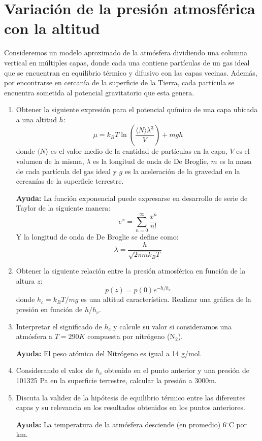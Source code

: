 \documentclass[a4paper,11pt]{article}
\begin{document}
\section{Variación de la presión atmosférica con la altitud}

Consideremos un modelo aproximado de la atmósfera dividiendo una 
columna vertical en múltiples capas, donde cada una contiene partículas 
de un gas ideal que se encuentran en equilibrio térmico y difusivo con 
las capas vecinas. Además, por encontrarse en cercanía de la superficie 
de la Tierra, cada partícula se encuentra sometida al potencial 
gravitatorio que esta genera.


\begin{enumerate}[label=(\alph*),
                  leftmargin=2\parindent,
                  rightmargin=2\parindent]

    \item{Obtener la siguiente expresión para el potencial químico de 
          una capa ubicada a una altitud $h$:
          $$ \mu =
          k_B T \ln \left( \frac{\langle N \rangle \lambda^3}{V} \right)
          + mgh $$
          donde $\langle N \rangle$ es el valor medio de la cantidad de 
          partículas en la capa, $V$ es el volumen de la misma, 
          $\lambda$ es la longitud de onda de De Broglie, $m$ es la 
          masa de cada partícula del gas ideal y $g$ es la aceleración 
          de la gravedad en la cercanías de la superficie terrestre.
          }

    {\small
    \textbf{Ayuda:}
    La función exponencial puede expresarse en desarrollo de serie de 
    Taylor de la siguiente manera:
    $$ e^x = \sum_{n=0}^\infty \frac{x^n}{n!} $$
    Y la longitud de onda de De Broglie se define como:
    $$ \lambda = \frac{h}{\sqrt{2\pi m k_B T}} $$
    }

    \item{Obtener la siguiente relación entre la presión atmosférica 
          en función de la altura $z$:
          $$ p(z) = p(0) e^{-h/h_c} $$
          donde $h_c = k_B T / mg$ es una altitud característica.
          Realizar una gráfica de la presión en función de $h/h_c$.
          }
    
    \item{Interpretar el significado de $h_c$ y calcule su valor si 
          consideramos una atmósfera a $T = 290 K$ compuesta por 
          nitrógeno (N$_2$).}

    {\small
    \textbf{Ayuda:}
    El peso atómico del Nitrógeno es igual a 14 g/mol.
    }

    \item{Considerando el valor de $h_c$ obtenido en el punto anterior 
          y una presión de 101325 Pa en la superficie terrestre,
          calcular la presión a 3000m.}

    \item{Discuta la validez de la hipótesis de equilibrio térmico 
          entre las diferentes capas y su relevancia en los resultados 
          obtenidos en los puntos anteriores.}
    
    {\small
    \textbf{Ayuda:}
    La temperatura de la atmósfera desciende (en promedio) 6$^\circ$C 
    por km.
    }

\end{enumerate}
\end{document}
